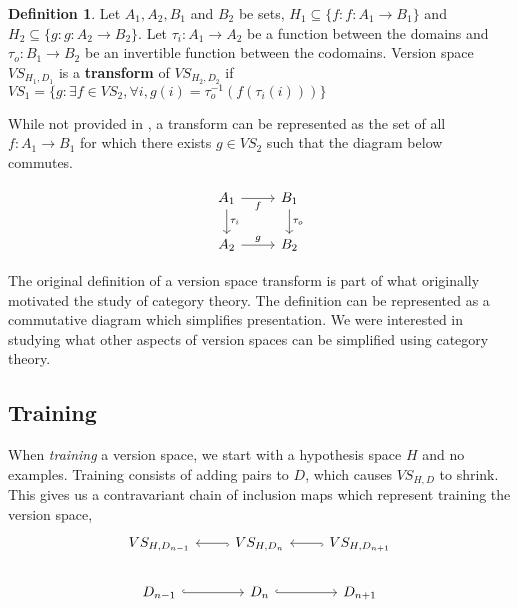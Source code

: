 \documentclass{article}
\theoremstyle{definition}
\newtheorem{definition}{Definition}[section]
\begin{document}
\begin{definition}
Let $A_1, A_2, B_1 $ and $B_2$ be sets, $H_1 \subseteq \{f : f: A_1 \rightarrow B_1\}$ and $H_2 \subseteq \{g: g: A_2 \rightarrow B_2\}$. Let $\tau_i: A_1 \rightarrow A_2$ be a function between the domains and $\tau_o:B_1 \rightarrow B_2$ be an invertible function between the codomains. Version space $VS_{H_1, D_1}$ is a \textbf{transform} of $VS_{H_2, D_2}$ if $VS_1 = \{g : \exists f \in VS_2, \forall i,  g(i) = \tau_o^{-1}(f(\tau_i(i)))\}$

While not provided in \cite{short}, a transform can be represented as the set of all $f:A_1 \rightarrow B_1$ for which there exists $g \in VS_2$ such that the diagram below commutes.

\[\begin{tikzcd}
	{A_1} & {B_1} \\
	{A_2} & {B_2}
	\arrow["{\tau_i}", from=1-1, to=2-1]
	\arrow["f"', from=1-1, to=1-2]
	\arrow["{\tau_o}", to=2-2, from=1-2]
	\arrow["g", from=2-1, to=2-2]
\end{tikzcd}\]

The original definition of a version space transform is part of what originally motivated the study of category theory. The definition can be represented as a commutative diagram which simplifies presentation. We were interested in studying what other aspects of version spaces can be simplified using category theory.

\subsection{Training}
When \textit{training} a version space, we start with a hypothesis space $H$ and no examples. Training consists of adding pairs to $D$, which causes $VS_{H,D}$ to shrink. This gives us a contravariant chain of inclusion maps which represent training the version space,
\[\begin{tikzcd}
	{VS_{H,D_{n-1}}} & {VS_{H,D_n}} & {VS_{H,D_{n+1}}} \\
	{D_{n-1}} & {D_n} & {D_{n+1}}
	\arrow[hook, from=1-3, to=1-2]
	\arrow[hook, from=2-2, to=2-3]
	\arrow[hook, from=1-2, to=1-1]
	\arrow[hook, from=2-1, to=2-2]
\end{tikzcd}\]

\end{definition}
\end{document}

